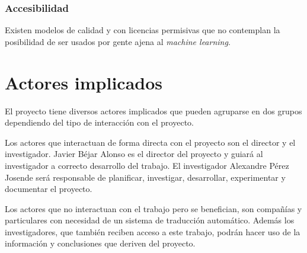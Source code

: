 \subsubsection{Accesibilidad}
Existen modelos de calidad y con licencias permisivas que no contemplan la posibilidad de
ser usados por gente ajena al \textit{machine learning}.


\section{Actores implicados}
El proyecto tiene diversos actores implicados que pueden agruparse en dos grupos dependiendo
del tipo de interacción con el proyecto.

Los actores que interactuan de forma directa con el proyecto son el director y el investigador.
Javier Béjar Alonso es el director del proyecto y guiará al investigador a correcto desarrollo
del trabajo. El investigador Alexandre Pérez Josende será responsable de planificar, investigar,
desarrollar, experimentar y documentar el proyecto.

Los actores que no interactuan con el trabajo pero se benefician, son compañías y particulares
con necesidad de un sistema de traducción automático. Además los investigadores, que también reciben
acceso a este trabajo, podrán hacer uso de la información y conclusiones que deriven del proyecto.